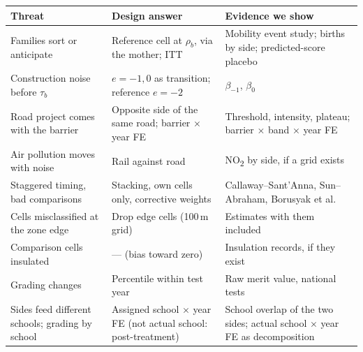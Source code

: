 \documentclass[11pt]{article}
\begin{document}
\begin{center}
\footnotesize
\renewcommand{\arraystretch}{1.25}
\begin{tabular}{@{}L{0.27\textwidth}L{0.35\textwidth}L{0.32\textwidth}@{}}
\toprule
\textbf{Threat} & \textbf{Design answer} & \textbf{Evidence we show} \\
\midrule
Families sort or anticipate & Reference cell at \(\rho_b\), via the mother; ITT & Mobility event study; births by side; predicted-score placebo \\
Construction noise before \(\tau_b\) & \(e = -1, 0\) as transition; reference \(e = -2\) & \(\beta_{-1}\), \(\beta_0\) \\
Road project comes with the barrier & Opposite side of the same road; barrier \(\times\) year FE & Threshold, intensity, plateau; barrier \(\times\) band \(\times\) year FE \\
Air pollution moves with noise & Rail against road & NO\textsubscript{2} by side, if a grid exists \\
Staggered timing, bad comparisons & Stacking, own cells only, corrective weights & Callaway--Sant'Anna, Sun--Abraham, Borusyak et al. \\
Cells misclassified at the zone edge & Drop edge cells (100\,m grid) & Estimates with them included \\
Comparison cells insulated & --- (bias toward zero) & Insulation records, if they exist \\
Grading changes & Percentile within test year & Raw merit value, national tests \\
Sides feed different schools; grading by school & Assigned school \(\times\) year FE (not actual school: post-treatment) & School overlap of the two sides; actual school \(\times\) year FE as decomposition \\
\bottomrule
\end{tabular}
\end{center}
\end{document}
